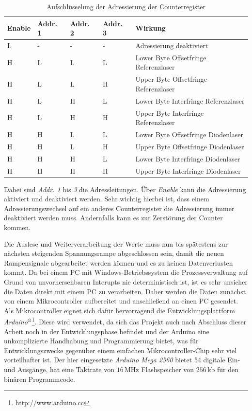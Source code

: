 \begin{table}
	\begin{tabular}{p{}p{}p{}p{}|p{}}
		\toprule
		Enable & Addr. 1 & Addr. 2 & Addr. 3 & Wirkung\\
		\midrule[1px]
		\hline
		L & - & - & - & Adressierung deaktiviert\\
		H & L & L & L & Lower Byte Offsetfringe Referenzlaser\\
		H & L & L & H & Upper Byte Offsetfringe Referenzlaser\\
		H & L & H & L & Lower Byte Interfringe Referenzlaser\\
		H & L & H & H & Upper Byte Interfringe Referenzlaser\\
		H & H & L & L & Lower Byte Offsetfringe Diodenlaser\\
		H & H & L & H & Upper Byte Offsetfringe Diodenlaser\\
		H & H & H & L & Lower Byte Interfringe Diodenlaser\\
		H & H & H & H & Upper Byte Interfringe Diodenlaser\\
		\bottomrule[1px]
	\end{tabular}
	\caption[Adressierung Counterregister]{Aufschlüsselung der Adressierung der
	Counterregister}
	\label{tab:adressbus_kodierung}
\end{table}
Dabei sind \textit{Addr. 1} bis \textit{3} die Adressleitungen. Über
\textit{Enable} kann die Adressierung aktiviert und deaktiviert werden. Sehr
wichtig hierbei ist, dass einem Adressierungswechsel auf ein anderes
Counterregister die Adressierung immer deaktiviert werden muss. Andernfalls kann
es zur Zerstörung der Counter kommen.\par
Die Auslese und Weiterverarbeitung der Werte muss nun bis spätestens zur
nächsten steigenden Spannungsrampe abgeschlossen sein, damit die neuen
Rampensignale abgearbeitet werden können und es zu keinen Datenverlusten kommt.
Da bei einem PC mit Windows-Betriebssystem die Prozessverwaltung auf Grund von
unvorhersehbaren Interupts nie deterministisch ist, ist es sehr unsicher die
Daten direkt mit einem PC zu verarbeiten. Daher werden die Daten zunächst von
einem Mikrocontroller aufbereitet und anschließend an einen PC gesendet. Als
Mikrocontroller eignet sich dafür hervorragend die Entwicklungsplattform
\textit{Arduino$^\text{\textregistered}$}\footnote{http://www.arduino.cc}. Diese
wird verwendet, da sich das Projekt auch nach Abschluss dieser Arbeit noch in
der Entwicklungsphase befindet und der Arduino eine unkomplizierte Handhabung
und Programmierung bietet, was für Entwicklungszwecke gegenüber einem einfachen
Mikrocontroller-Chip sehr viel vorteilhafter ist. Der hier eingesetzte
\textit{Arduino Mega 2560} bietet 54 digitale Ein- und Ausgänge, hat eine
Taktrate von $16\,$MHz Flashspeicher von $256\,$kb für den binären Programmcode.
